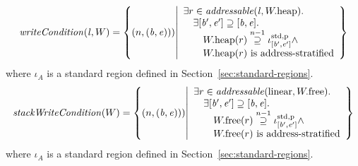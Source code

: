\documentclass[a4paper]{article}
\begin{document}
\[
  \writeCond{\lin,W} = \left\{ \npair{(\baddr,\eaddr)}) \middle| 
    \begin{array}{l}
      \exists r \in \addressable{\lin, \pwheap} \ldotp \\
      \quad \exists [\baddr',\eaddr'] \supseteq [\baddr,\eaddr] \ldotp \\
      \qquad \pwheap(r) \nsupeq[n-1] \stdreg{[\baddr',\eaddr']}{\pur} \wedge \\
      \qquad \pwheap(r) \text{ is address-stratified}
    \end{array}
  \right\}
\]
where $\iota_A$ is a standard region defined in Section~\ref{sec:standard-regions}.
\[
  \stackWriteCond{W} = \left\{ \npair{(\baddr,\eaddr)}) \middle| 
    \begin{array}{l}
      \exists r \in \addressable{\linear, \pwfree} \ldotp \\
      \quad \exists [\baddr',\eaddr'] \supseteq [\baddr,\eaddr] \ldotp \\
      \qquad \pwfree(r) \nsupeq[n-1] \stdreg{[\baddr',\eaddr']}{\pur} \wedge \\
      \qquad \pwfree(r) \text{ is address-stratified}
    \end{array}
  \right\}
\]
where $\iota_A$ is a standard region defined in Section~\ref{sec:standard-regions}.

\end{document}
